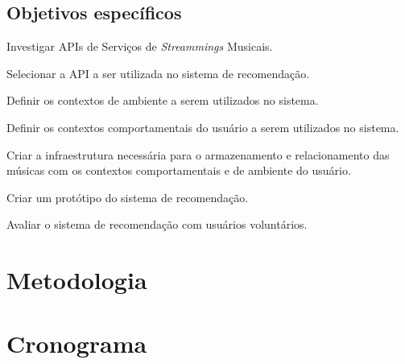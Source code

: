 \documentclass{article}
\begin{document}
\subsection{Objetivos específicos}

\begin{itemize}
\item Investigar APIs de Serviços de \textit{Streammings} Musicais.

\item Selecionar a API a ser utilizada no sistema de recomendação.

{\color{red} \item Definir os contextos de ambiente a serem utilizados no sistema.

\item Definir os contextos comportamentais do usuário a serem utilizados no sistema.}

\item Criar a infraestrutura necessária para o armazenamento e relacionamento das músicas com os contextos comportamentais e de ambiente do usuário.

{\color{red} \item Criar um protótipo do sistema de recomendação.}

\item Avaliar o sistema de recomendação com usuários voluntários.

\end{itemize}

\newpage

\section{Metodologia}

\newpage

\section{Cronograma}

\newpage


% 

\end{document}
